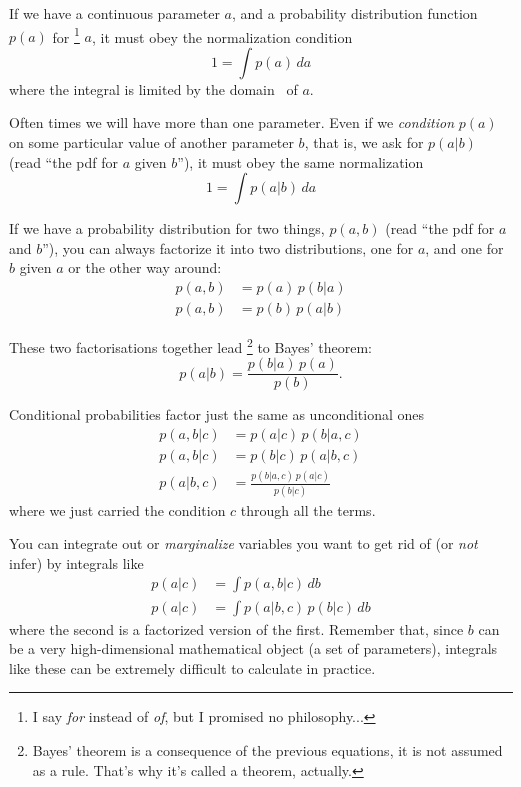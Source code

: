 \documentclass[a4paper,11pt]{article}
\begin{document}
If we have a continuous parameter $a$, and a probability distribution function $p(a)$ for%
\footnote{I say \emph{for} instead of \emph{of}, but I promised no philosophy...} $a$, it must obey the normalization condition
%
\begin{equation}
   1 = \int p(a) \, da
\end{equation}
%
where the integral is limited by the domain%
~of $a$.

Often times we will have more than one parameter. 
Even if we \emph{condition} $p(a)$ on some particular value of another parameter $b$, that is, we ask for $p(a | b)$ (read ``the pdf for $a$ given $b$''), it must obey the same normalization
%
\begin{equation}\label{eq:normalisation}
   1 = \int p(a|b) \, da
\end{equation}
%

If we have a probability distribution for two things, $p(a,b)$ (read ``the pdf for $a$ and
$b$''), you can always factorize it into two distributions, one for $a$, and one for $b$ given $a$ or the other way around:
%
\begin{align}
   p(a,b) &= p(a) \, p(b|a)\\
   p(a,b) &= p(b) \, p(a|b)
\end{align}
%

These two factorisations together lead%
\footnote{Bayes' theorem is a consequence of the previous equations, it is not assumed as a rule. That's why it's called a theorem, actually.} to Bayes' theorem:
%
\begin{equation}
   p(a|b) = \frac{p(b|a)\,p(a)}{p(b)} .
\end{equation}
%

Conditional probabilities factor just the same as unconditional ones
%
\begin{align}
   p(a,b|c) &= p(a|c) \, p(b|a,c)\\
   p(a,b|c) &= p(b|c) \, p(a|b,c)\\
   p(a|b,c) &= \frac{p(b|a,c)\,p(a|c)}{p(b|c)} \label{eq:bayes}
\end{align}
%   
where we just carried the condition $c$ through all the terms.

You can integrate out or \emph{marginalize} variables you want to get rid of (or \emph{not} infer) by integrals like
%
\begin{align}
   p(a|c) &= \int p(a,b|c) \, db \\
   p(a|c) &= \int p(a|b,c)\,p(b|c) \, db
\end{align}
%
where the second is a factorized version of the first.
Remember that, since $b$ can be a very high-dimensional mathematical object (a set of parameters), integrals like these can be extremely difficult to calculate in practice.
\end{document}
